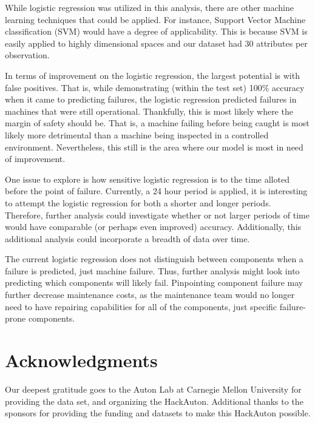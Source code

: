 \documentclass{article}
\begin{document}
While logistic regression was utilized in this analysis, there are other machine learning techniques that could be applied. For instance, Support Vector Machine classification (SVM) would have a degree of applicability. This is because SVM is easily applied to highly dimensional spaces and our dataset had 30 attributes per observation. \cite{Cortes1995}

In terms of improvement on the logistic regression, the largest potential is with false positives. That is, while demonstrating (within the test set) 100\% accuracy when it came to predicting failures, the logistic regression predicted failures in machines that were still operational. Thankfully, this is most likely where the margin of safety should be. That is, a machine failing before being caught is most likely more detrimental than a machine being inspected in a controlled environment. Nevertheless, this still is the area where our model is most in need of improvement.

One issue to explore is how sensitive logistic regression is to the time alloted before the point of failure. Currently, a 24 hour period is applied, it is interesting to attempt the logistic regression for both a shorter and longer periods. Therefore, further analysis could investigate whether or not larger periods of time would have comparable (or perhaps even improved) accuracy. Additionally, this additional analysis could incorporate a breadth of data over time.

The current logistic regression does not distinguish between components when a failure is predicted, just machine failure. Thus, further analysis might look into predicting which components will likely fail. Pinpointing component failure may further decrease maintenance costs, as the maintenance team would no longer need to have repairing capabilities for all of the components, just specific failure-prone components.


\section{Acknowledgments}
Our deepest gratitude goes to the Auton Lab at Carnegie Mellon University for providing the data set, and organizing the HackAuton. Additional thanks to the sponsors for providing the funding and datasets to make this HackAuton possible.




\end{document}
